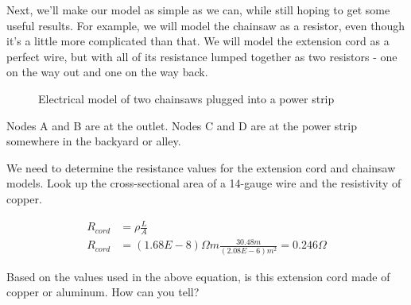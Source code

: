 Next, we'll make our model as simple as we can, while still hoping to get some useful results. For example, we will model the chainsaw as a resistor, even though it's a little more complicated than that. We will model the extension cord as a perfect wire, but with all of its resistance lumped together as two resistors - one on the way out and one on the way back.

\begin{figure}[H]
\begin{center}
\caption{Electrical model of two chainsaws plugged into a power strip}
\end{center}
\end{figure}

Nodes A and B are at the outlet. Nodes C and D are at the power strip somewhere in the backyard or alley.

\par
We need to determine the resistance values for the extension cord and chainsaw models. Look up the cross-sectional area of a 14-gauge wire and the resistivity of copper.
\par
\begin{align*}
R_{cord} &= \rho \frac{L}{A}\\
R_{cord}&=(1.68E-8) \Omega m \frac{30.48 m}{(2.08E-6) m^2} = 0.246 \Omega
\end{align*}

\begin{blevel}
Based on the values used in the above equation, is this extension cord made of copper or aluminum. How can you tell? 
\end{blevel}

